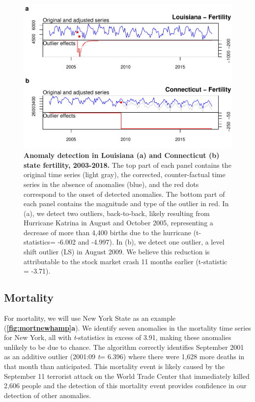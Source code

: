\documentclass[12pt]{article}
\begin{document}
\begin{figure}
\centering
\includegraphics{MainDocument_files/figure-latex/FertilityAnomalies-1.pdf}
\caption{\textbf{Anomaly detection in Louisiana (a) and Connecticut (b) state fertility, 2003-2018.}
The top part of each panel contains the original time series (light
gray), the corrected, counter-factual time series in the absence of
anomalies (blue), and the red dots correspond to the onset of detected
anomalies. The bottom part of each panel contains the magnitude and type
of the outlier in red. In (a), we detect two outliers, back-to-back,
likely resulting from Hurricane Katrina in August and October 2005,
representing a decrease of more than 4,400 births due to the hurricane
(t-statistics= -6.002 and -4.997). In (b), we detect one outlier, a
level shift outlier (LS) in August 2009. We believe this reduction is
attributable to the stock market crash 11 months earlier (t-statistic =
-3.71). \label{fig:fertla}}
\end{figure}

\hypertarget{mortality}{%
\subsection{Mortality}\label{mortality}}

For mortality, we will use New York State as an example
(\textbf{\autoref{fig:mortnewhamp}a}). We identify seven anomalies in
the mortality time series for New York, all with \emph{t}-statistics in
excess of 3.91, making these anomalies unlikely to be due to chance. The
algorithm correctly identifies September 2001 as an additive outlier
(2001:09 \emph{t}= 6.396) where there were 1,628 more deaths in that
month than anticipated. This mortality event is likely caused by the
September 11 terrorist attack on the World Trade Center that immediately
killed 2,606 people and the detection of this mortality event provides
confidence in our detection of other anomalies.
\end{document}
